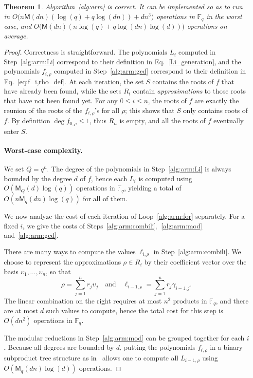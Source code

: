 \documentclass{article}
\newcommand{\ff}[1]{\mathbb{F}_{#1}}
\newcommand{\qq}{q}
\newcommand{\basef}{\ff{\qq}}
\newcommand{\Mul}{\mathsf{M}}
\newtheorem{Theo}{Theorem}
\begin{document}
\begin{Theo}
  \label{th:arm}
  Algorithm~\ref{alg:arm} is correct. It can be implemented so as to
  run in $O\bigl(n\Mul(dn)(\log(q) + q\log(dn)) + dn^3\bigr)$
  operations in $\basef$ in the worst case, and
  $O\bigl(\Mul(dn)(n\log(q) + q\log(dn)\log(d))\bigr)$ operations on
  average.
\end{Theo}
\begin{proof}
  Correctness is straightforward. The polynomials $L_i$ computed in
  Step~\ref{alg:arm:Li} correspond to their definition in
  Eq.~\eqref{Li_generation}, and the polynomials $f_{i,\rho}$ computed
  in Step~\ref{alg:arm:gcd} correspond to their definition in
  Eq.~\eqref{eq:f_i,rho_def}. %
  At each iteration, the set $S$ contains the roots of $f$ that have
  already been found, while the sets $R_i$ contain
  \emph{approximations} to those roots that have not been found yet. %
  For any $0\le i\le n$, the roots of $f$ are exactly the reunion of
  the roots of the $f_{i,\rho}$'s for all $\rho$; this shows that $S$
  only contains roots of $f$. %
  By definition $\deg f_{0,\rho}\le 1$, thus $R_n$ is empty, and all
  the roots of $f$ eventually enter $S$.

  \paragraph{Worst-case complexity.} We set $Q=q^n$.  The degree of the
  polynomials in Step~\ref{alg:arm:Li} is always bounded by the degree
  $d$ of $f$, hence each $L_i$ is computed using
  $O(\Mul_Q(d)\log(q))$ operations in $\basef$, yielding a total of
  $O(n\Mul_q(dn)\log(q))$ for all of them.

  We now analyze the cost of each iteration of Loop~\ref{alg:arm:for}
  separately. For a fixed $i$, we give the costs of
  Steps~\ref{alg:arm:combili},~\ref{alg:arm:mod}
  and~\ref{alg:arm:gcd}.

  There are many ways to compute the values $\ell_{i,\rho}$ in
  Step~\ref{alg:arm:combili}. We choose to represent the
  approximations $\rho\in R_i$ by their coefficient vector over the
  basis $\upsilon_1,\dots,\upsilon_n$, so that
  \[
    \rho = \sum_{j=1}^n r_j\upsilon_j 
    \quad\text{and}\quad
    \ell_{i-1,\rho} = \sum_{j=1}^n r_j\gamma_{i-1,j}.
  \]
  The linear combination on the right requires at most $n^2$ products
  in $\basef$, and there are at most $d$ such values to compute, hence
  the total cost for this step is $O(dn^2)$ operations in $\basef$.

  The modular reductions in Step~\ref{alg:arm:mod} can be grouped
  together for each $i$. %
  Because all degrees are bounded by $d$, putting the polynomials
  $f_{i,\rho}$ in a binary subproduct tree structure as
  in~\cite[Lemma~10.4]{Gathen2003} allows one to compute all
  $L_{i-1,\rho}$ using $O(\Mul_q(dn)\log(d))$ operations.


\end{proof}
\end{document}
